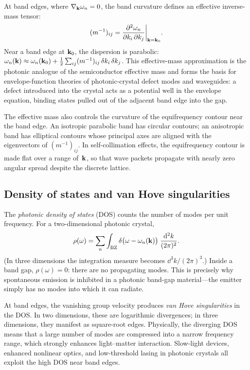 At band edges, where $\nabla_{\mathbf{k}}\omega_n = 0$, the band curvature defines
an effective inverse-mass tensor:
\begin{equation}
 (m^{-1})_{ij}
 = \frac{\partial^2\omega_n}{\partial k_i\,\partial k_j}
 \bigg|_{\mathbf{k} = \mathbf{k}_0}.
 \label{eq:effective-mass}
\end{equation}
Near a band edge at $\mathbf{k}_0$, the dispersion is parabolic:
$\omega_n(\mathbf{k}) \approx \omega_n(\mathbf{k}_0) + \tfrac{1}{2}\sum_{ij}
(m^{-1})_{ij}\,\delta k_i\,\delta k_j$. This effective-mass
approximation is the photonic analogue of the semiconductor effective mass
and forms the basis for envelope-function theories of photonic-crystal
defect modes and waveguides: a defect introduced into the crystal acts as
a potential well in the envelope equation, binding states pulled out of
the adjacent band edge into the gap.

The effective mass also controls the curvature of the equifrequency
contour near the band edge. An isotropic parabolic band has circular
contours; an anisotropic band has elliptical contours whose principal axes
are aligned with the eigenvectors of $(m^{-1})_{ij}$. In self-collimation
effects, the equifrequency contour is made flat over a range of~$\mathbf{k}$,
so that wave packets propagate with nearly zero angular spread despite
the discrete lattice.

\subsection{Density of states and van Hove singularities}
\label{ssec:dos}

The \emph{photonic density of states} (DOS) counts the number of modes
per unit frequency. For a two-dimensional photonic crystal,
\begin{equation}
 \rho(\omega)
 = \sum_n \int_{\mathrm{BZ}}
 \delta\bigl(\omega - \omega_n(\mathbf{k})\bigr)\;
 \frac{\mathop{}\!\mathrm{d}^2 k}{(2\pi)^2}.
 \label{eq:dos}
\end{equation}
(In three dimensions the integration measure becomes
$\dd^3 k/(2\pi)^3$.)
Inside a band gap, $\rho(\omega) = 0$: there are no propagating modes.
This is precisely why spontaneous emission is inhibited in a photonic
band-gap material---the emitter simply has no modes into which it can
radiate.

At band edges, the vanishing group velocity produces \emph{van Hove
singularities} in the DOS. In two dimensions, these are logarithmic
divergences; in three dimensions, they manifest as square-root edges.
Physically, the diverging DOS means that a large number of modes are
compressed into a narrow frequency range, which strongly enhances
light--matter interaction. Slow-light devices, enhanced nonlinear optics,
and low-threshold lasing in photonic crystals all exploit the high DOS
near band edges.

